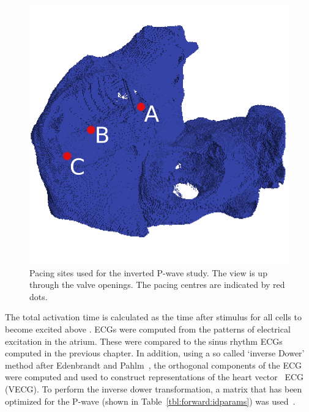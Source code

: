 \begin{figure}
\begin{center}
\includegraphics{figures/forward/inverted_p_wave/pacing_sites}
\end{center}
\caption[Pacing Sites Along The CT]{
\label{fig:forward:inverse:ct_sites}
Pacing sites used for the inverted P-wave study.
The view is up through the valve openings.
The pacing centres are indicated by red dots.
}
\end{figure}

The total activation time is calculated as the time after stimulus for all cells
to become excited above .
ECGs were computed from the patterns of electrical excitation in the atrium.
These were compared to the sinus rhythm ECGs computed in the previous chapter.
In addition, using a so called `inverse Dower' method after Edenbrandt and
Pahlm~\cite{Edenbrandt1988}, the orthogonal components of the ECG were computed
and used to construct representations of the heart
vector~\cite{Frank1956,MacFarlane1989a} ECG (VECG).
To perform the inverse dower transformation, a matrix that has been optimized for
the P-wave (shown in Table~\ref{tbl:forward:idparams}) was
used~\cite{Guillem2007}.


